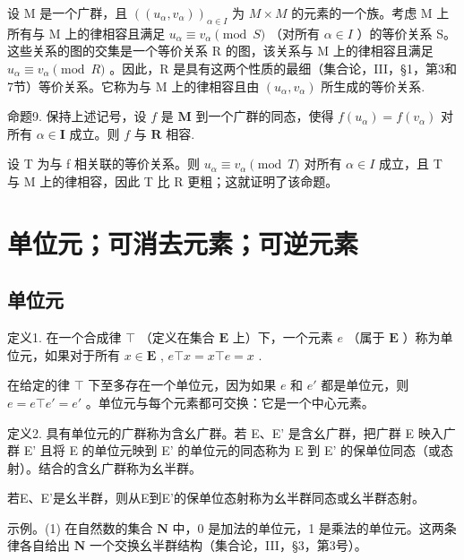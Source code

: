 设 M 是一个广群，且 \(((u_{\alpha}, v_{\alpha}))_{\alpha \in I}\) 为 \(M \times M\) 的元素的一个族。考虑 M 上所有与 M 上的律相容且满足 \(u_{\alpha} \equiv v_{\alpha} \pmod{S}\) （对所有 \(\alpha \in I\) ）的等价关系 S。这些关系的图的交集是一个等价关系 R 的图，该关系与 M 上的律相容且满足 \(u_{\alpha} \equiv v_{\alpha} \pmod{R}\) 。因此，R 是具有这两个性质的最细（集合论，III，§1，第3和7节）等价关系。它称为与 M 上的律相容且由 \((u_{\alpha}, v_{\alpha})\) 所生成的等价关系.

命题9. 保持上述记号，设 \(f\) 是 \(\mathbf{M}\) 到一个广群的同态，使得 \(f(u_{\alpha}) = f(v_{\alpha})\) 对所有 \(\alpha \in \mathbf{I}\) 成立。则 \(f\) 与 \(\mathbf{R}\) 相容.

设 T 为与 f 相关联的等价关系。则 \(u_{\alpha} \equiv v_{\alpha} \pmod{T}\) 对所有 \(\alpha \in I\) 成立，且 T 与 M 上的律相容，因此 T 比 R 更粗；这就证明了该命题。

\section{单位元；可消去元素；可逆元素}

\subsection{单位元}

定义1. 在一个合成律 \(\top\) （定义在集合 \(\mathbf{E}\) 上）下，一个元素 \(e\) （属于 \(\mathbf{E}\) ）称为单位元，如果对于所有 \(x \in \mathbf{E}\) , \(e \top x = x \top e = x\) .

在给定的律 \(\top\) 下至多存在一个单位元，因为如果 \(e\) 和 \(e'\) 都是单位元，则 \(e = e \top e' = e'\) 。单位元与每个元素都可交换：它是一个中心元素。

定义2. 具有单位元的广群称为含幺广群。若 E、E' 是含幺广群，把广群 E 映入广群 E' 且将 E 的单位元映到 E' 的单位元的同态称为 E 到 E' 的保单位同态（或态射）。结合的含幺广群称为幺半群。

若E、E'是幺半群，则从E到E'的保单位态射称为幺半群同态或幺半群态射。

示例。(1) 在自然数的集合 \(\mathbf{N}\) 中，0 是加法的单位元，1 是乘法的单位元。这两条律各自给出 \(\mathbf{N}\) 一个交换幺半群结构（集合论，III，§3，第3号）。

